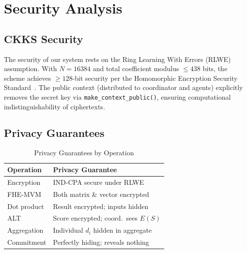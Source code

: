 \begin{table}[H]
\centering
\caption{Verifiable Aggregation Test Results}
\label{tab:ver_results}
\footnotesize
{}
\end{table}

\section{Security Analysis}
\label{sec:security}

\subsection{CKKS Security}

The security of our system rests on the Ring Learning With Errors (RLWE) assumption. With $N = 16384$ and total coefficient modulus $\leq 438$ bits, the scheme achieves $\geq 128$-bit security per the Homomorphic Encryption Security Standard~\cite{HEStandard2018}. The public context (distributed to coordinator and agents) explicitly removes the secret key via \texttt{make\_context\_public()}, ensuring computational indistinguishability of ciphertexts.

\FloatBarrier
\subsection{Privacy Guarantees}

\begin{table}[H]
\centering
\caption{Privacy Guarantees by Operation}
\label{tab:privacy}
\footnotesize
\begin{tabular}{@{}lp{5cm}@{}}
\toprule
\textbf{Operation} & \textbf{Privacy Guarantee} \\
\midrule
Encryption & IND-CPA secure under RLWE \\
FHE-MVM & Both matrix \& vector encrypted \\
Dot product & Result encrypted; inputs hidden \\
ALT & Score encrypted; coord.\ sees $E(S)$ \\
Aggregation & Individual $d_i$ hidden in aggregate \\
Commitment & Perfectly hiding; reveals nothing \\
\bottomrule
\end{tabular}
\end{table}

